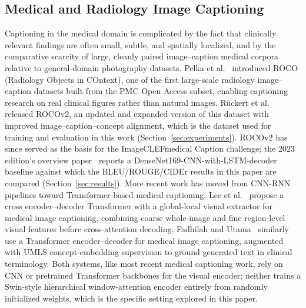 \subsection{Medical and Radiology Image Captioning}
Captioning in the medical domain is complicated by the fact that clinically relevant findings are often small, subtle, and spatially localized, and by the comparative scarcity of large, cleanly paired image--caption medical corpora relative to general-domain photography datasets. Pelka et al.~\cite{pelka2018roco} introduced ROCO (Radiology Objects in COntext), one of the first large-scale radiology image--caption datasets built from the PMC Open Access subset, enabling captioning research on real clinical figures rather than natural images. Rückert et al.~\cite{ruckert2024rocov2} released ROCOv2, an updated and expanded version of this dataset with improved image--caption--concept alignment, which is the dataset used for training and evaluation in this work (Section~\ref{sec:experiments}). ROCOv2 has since served as the basis for the ImageCLEFmedical Caption challenge; the 2023 edition's overview paper~\cite{ruckert2023imageclef} reports a DenseNet169-CNN-with-LSTM-decoder baseline against which the BLEU/ROUGE/CIDEr results in this paper are compared (Section~\ref{sec:results}). More recent work has moved from CNN-RNN pipelines toward Transformer-based medical captioning. Lee et al.~\cite{lee2022cross} propose a cross encoder--decoder Transformer with a global-local visual extractor for medical image captioning, combining coarse whole-image and fine region-level visual features before cross-attention decoding. Fadhilah and Utama~\cite{fadhilah2026transformer} similarly use a Transformer encoder--decoder for medical image captioning, augmented with UMLS concept-embedding supervision to ground generated text in clinical terminology. Both systems, like most recent medical captioning work, rely on CNN or pretrained Transformer backbones for the visual encoder; neither trains a Swin-style hierarchical window-attention encoder entirely from randomly initialized weights, which is the specific setting explored in this paper.

